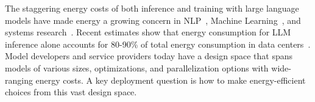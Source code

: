 


The staggering energy costs of both inference and training with large language models have made energy a growing concern in NLP~\cite{strubell19,fernandez-etal-2025-energy,huang2026eop}, Machine Learning~\cite{Jesse-dodge-icml,ICLR2025_8e016430}, and systems research~\cite{wilkins2024offlineenergyoptimalllmserving}. 
Recent estimates show that energy consumption for LLM inference alone accounts for 80-90\% of total energy consumption in data centers~\cite{Wenjen_2024}. Model developers and service providers today have a design space that spans models of various sizes, optimizations, and parallelization options with wide-ranging energy costs. A key deployment question is how to make energy-efficient choices from this vast design space.






